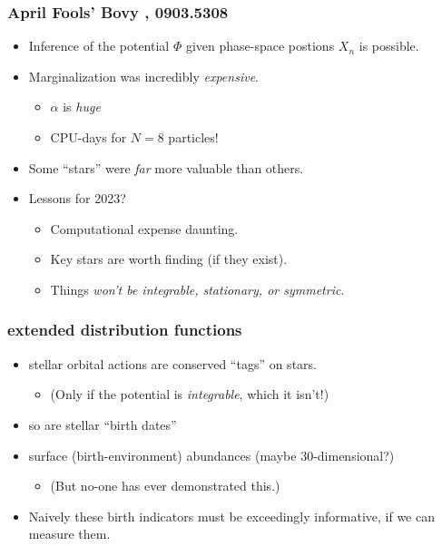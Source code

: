 \documentclass[pdftex]{beamer}
\begin{document}
\begin{frame}
  \frametitle{April Fools' {\footnotesize Bovy \etal, 0903.5308}}
  \begin{itemize}
  \item Inference of the potential $\Phi$ given phase-space postions
    $X_n$ is possible.
  \item Marginalization was incredibly \emph{expensive}.
    \begin{itemize}
    \item $\alpha$ is \emph{huge}
    \item CPU-days for $N=8$ particles!
    \end{itemize}
  \item Some ``stars'' were \emph{far} more valuable than others.
  \item Lessons for 2023?
    \begin{itemize}
    \item Computational expense daunting.
    \item Key stars are worth finding (if they exist).
    \item Things \emph{won't be integrable, stationary, or symmetric}.
    \end{itemize}
  \end{itemize}
\end{frame}

\begin{frame}
  \frametitle{extended distribution functions}
  \begin{itemize}
  \item stellar orbital actions are conserved ``tags'' on stars.
    \begin{itemize}
    \item (Only if the potential is \emph{integrable}, which it isn't!)
    \end{itemize}
  \item so are stellar ``birth dates''
  \item surface (birth-environment) abundances (maybe 30-dimensional?)
    \begin{itemize}
    \item (But no-one has ever demonstrated this.)
    \end{itemize}
  \item Naively these birth indicators must be exceedingly informative, if we can measure them.
  \end{itemize}
\end{frame}
\end{document}
